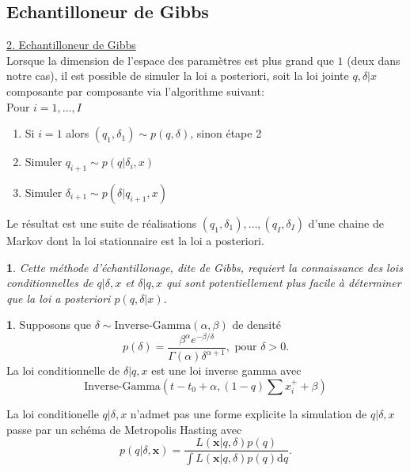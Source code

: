 \documentclass[8pt,notheorems]{beamer}
\newtheorem{remark}{\translate{Remark}}
\theoremstyle{definition}
\theoremstyle{example}
\newtheorem{example}{\translate{Example}}
\theoremstyle{mystyle}
\theoremstyle{plain}
\begin{document}
\subsection{Echantilloneur de Gibbs}
\begin{frame}[allowframebreaks]
\underline{2. Echantilloneur de Gibbs}\\
Lorsque la dimension de l'espace des paramètres est plus grand que $1$ (deux dans notre cas), il est possible de simuler la loi a posteriori, soit la loi jointe $q,\delta|x$ composante par composante via l'algorithme suivant:\\

Pour $i = 1,\ldots, I$
\begin{enumerate}
\item Si $i=1$ alors $(q_1,\delta_1)\sim p(q,\delta)$, sinon étape 2
\item Simuler $q_{i+1}\sim p(q|\delta_i,x)$
\item Simuler $\delta_{i+1}\sim p(\delta|q_{i+1},x)$
\end{enumerate}

Le résultat est une suite de réalisations $(q_1,\delta_1),\ldots, (q_I,\delta_I)$ d'une chaine de Markov dont la loi stationnaire est la loi a posteriori. 
\begin{remark}
Cette méthode d'échantillonage, dite de Gibbs, requiert la connaissance des lois conditionnelles de $q|\delta,x$ et $\delta|q,x$ qui sont potentiellement plus facile à déterminer que la loi a posteriori $p(q,\delta|x)$.
\end{remark}
\begin{example}
Supposons que $\delta\sim \text{Inverse-Gamma}(\alpha,\beta)$ de densité 
$$
p(\delta) = \frac{\beta^\alpha e^{-\beta/\delta}}{\Gamma(\alpha)\delta^{\alpha+1}},\text{ pour }\delta>0. 
$$
La loi conditionnelle de $\delta|q,x$ est une loi inverse gamma avec
$$
\text{Inverse-Gamma}(t-t_0 + \alpha,(1-q)\sum x_i^+ + \beta )
$$
\end{example}
La loi conditionelle $q|\delta,x$ n'admet pas une forme explicite la simulation de $q|\delta,x$ passe par un schéma de Metropolis Hasting avec 
$$
p(q|\delta, \mathbf{x}) = \frac{L(\mathbf{x}|q, \delta)p(q)}{\int L(\mathbf{x}|q, \delta)p(q)\text{d}q}.
$$
\end{frame}
\end{document}
